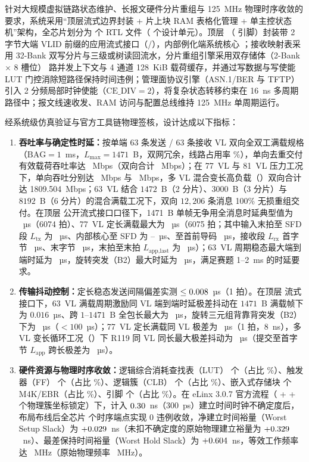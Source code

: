 \documentclass[a4paper,zihao=-4,fontset=none,oneside,openany]{ctexrep}
\begin{document}
针对大规模虚拟链路状态维护、长报文硬件分片重组与 125~MHz 物理时序收敛的要求，系统采用“顶层流式边界封装 + 片上块 RAM 表格化管理 + 单主控状态机”架构，全芯片划分为 \RtlFileCount{} 个 RTL 文件（\DesignUnitCount{} 个设计单元）。顶层 （\Pins{} 引脚）封装带 2 字节大端 VLID 前缀的应用流式接口（/），内部例化端系统核心 ；接收映射表采用 32-Bank 双写分片与三级或树读回流水，分片重组引擎采用双存储体（2-Bank $\times$ 8 槽位）\ReasmContexts{} 路并发上下文与 4 通道 128~KiB 载荷缓存，并通过写数据与写使能 LUT 门控消除短路径保持时间违例；管理面协议引擎（ASN.1/BER 与 TFTP）引入 2 分频局部时钟使能（$\text{CE\_DIV}=2$），将复杂状态转移约束在 16~ns 多周期路径中；报文线速收发、RAM 访问与配置总线维持 125~MHz 单周期运行。

经系统级仿真验证与官方工具链物理签核，设计达成以下指标：
\begin{enumerate}[leftmargin=2em,itemsep=1pt]
  \item \textbf{吞吐率与确定性时延：}按单端 63 条发送 / 63 条接收 VL 双向全双工满载规格（$\text{BAG}=1$~ms，$L_\text{max}=1471$~B，双网冗余，线路占用率 \LineUtilSixtyThree\%），单向去重交付有效载荷吞吐率达 \ThruSixtyThree~Mbps（双向合计 \ThruSixtyThreeBi~Mbps）；在 77~VL 与 81~VL 压力工况下，单向吞吐分别达 \Thru~Mbps 与 \ThruEightyOne~Mbps，多 VL 混合变长高负载（）双向合计达 1809.504~Mbps；63~VL 结合 $1472$~B（2 分片）、$3000$~B（3 分片）与 $8192$~B（6 分片）的混合满载工况下，双向 $12,206$ 条消息 100\% 无损重组交付。在顶层  公开流式接口口径下，1471~B 单帧无争用全消息时延典型值为 \LatAvg~µs（6074 拍）、77~VL 定长满载最大为 \Lat~µs（6075 拍；其中输入末拍至 SFD 段 $L_\text{tx}$ 为 \Ttx~µs、内部核心至 SFD 为 \TtxCore--\TtxCoreMax~µs、至首前导码 \TtxSof~µs，接收段 $L_\text{rx}$ 首字节 \Trx~µs、末字节 \TrxLast~µs，末拍至末拍 $L_\text{app,last}$ 为 \LatAppLast~µs）；63~VL 周期稳态最大端到端时延为 \LatSixtyThreePMax~µs，旋转突发（B2）最大时延为 \LatSixtyThreeBTwo~µs，满足赛题 1--2~ms 的时延要求。
  \pagebreak
  \item \textbf{传输抖动控制：}定长稳态发送间隔偏差实测 $\le0.008$~µs（1 拍）。在顶层  流式接口下，63~VL 满载周期激励同 VL 端到端时延极差抖动在 $1471$~B 满载帧下为 $0.016$~µs、跨 $1\text{--}1471$~B 全包长最大为 \JitSixtyThreePer~µs，旋转三元组背靠背突发（B2）下为 \JitSixtyThreeBTwo~µs（$<100$~µs）；77~VL 定长满载同 VL 极差为 \JitSameVl~µs（1 拍，8~ns），多 VL 变长循环工况（）下 R119 同 VL 同长最大极差抖动为 \JitVarCycle~µs（提交至首字节 $L_\text{app}$ 跨长极差为 \JitVarCycleApp~µs）。
  \item \textbf{硬件资源与物理时序收敛：}逻辑综合消耗查找表（LUT）\Lut{} 个（占比 \LutPct\%）、触发器（FF）\FF{} 个（占比 \FFPct\%）、逻辑簇（CLB）\Clb{} 个（占比 \ClbPct\%）、嵌入式存储块 \Mem{} 个 M4K/EBR（占比 \MemPct\%）、引脚 \Pins{} 个（占比 \PinPct\%）。在 eLinx 3.0.7 官方流程（ +  + \LockedClusters{} 个物理簇坐标锁定）下，计入 $0.30$~ns（300~ps）建立时间时钟不确定度后，布局布线后全芯片 \RoutedEndpoints{} 个时序端点实现 0 违例收敛，净建立时间裕量（Worst Setup Slack）为 $+0.029$~ns（未扣不确定度的原始物理建立裕量为 $+0.329$~ns）、最差保持时间裕量（Worst Hold Slack）为 $+0.604$~ns，等效工作频率达 \RoutedFmax~MHz（原始物理频率 \RoutedFmaxRaw~MHz）。

\end{enumerate}
\end{document}

